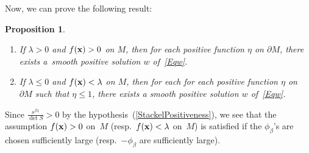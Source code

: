 \documentclass[pdftex]{sigma}
\numberwithin{equation}{section}
\newtheorem{Proposition}[Theorem]{Proposition}
 { \theoremstyle{definition}
\newtheorem{Definition}[Theorem]{Definition}
\newtheorem{Example}[Theorem]{Example}
\newtheorem{Remark}[Theorem]{Remark} }
\begin{document}
Now, we can prove the following result:

\begin{Proposition} \label{Yamabe}\quad
\begin{enumerate}\itemsep=0pt
\item[$1.$] If $\lambda >0$ and $f({\bf x})>0$ on $M$, then for each positive function $\eta$ on $\partial M$, there exists a~smooth positive solution $w$ of~\eqref{Eqw}.
\item[$2.$] If $\lambda \leq 0$ and $f({\bf x}) < \lambda$ on $M$, then for each for each positive function $\eta$ on $\partial M$ such that $\eta \leq 1$, there exists a smooth positive solution $w$ of~\eqref{Eqw}.
    \end{enumerate}	
\end{Proposition}

\begin{Remark}Since $\frac{s^{\beta 1}}{\det S} >0$ by the hypothesis~(\ref{StackelPositiveness}), we see that the assumption $f({\bf x})>0$ on~$M$ (resp.~$f({\bf x}) < \lambda$ on~$M$) is satisfied if the $\phi_{\beta}$'s are chosen sufficiently large (resp.~$-\phi_{\beta}$ are sufficiently large).
\end{Remark}
\end{document}
